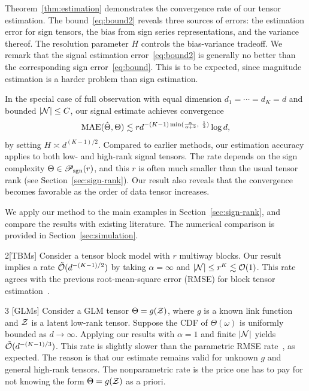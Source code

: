 \documentclass{article}
\theoremstyle{plain}
\theoremstyle{definition}
\def\caliP{\mathscr{P}_{\textup{sgn}}}
\begin{document}
Theorem~\ref{thm:estimation} demonstrates the convergence rate of our tensor estimation. The bound~\eqref{eq:bound2} reveals three sources of errors: the estimation error for sign tensors, the bias from sign series representations, and the variance thereof. The resolution parameter $H$ controls the bias-variance tradeoff. We remark that the signal estimation error~\eqref{eq:bound2} is generally no better than the corresponding sign error~\eqref{eq:bound}. This is to be expected, since magnitude estimation is  a harder problem than sign estimation. 

In the special case of full observation with equal dimension $d_1=\cdots=d_K=d$ and bounded $|\mathcal{N}|\leq C$, our signal estimate achieves convergence
\begin{equation}
\textup{MAE}(\hat \Theta, \Theta)\lesssim rd^{-(K-1)\min({\alpha\over \alpha+2},\ {1\over 2})}\log d,
\end{equation}
by setting $H\asymp d^{(K-1)/2}$. Compared to earlier methods, our estimation accuracy applies to both low- and high-rank signal tensors. The rate depends on the sign complexity $\Theta\in\caliP(r)$, and this $r$ is often much smaller than the usual tensor rank (see Section~\ref{sec:sign-rank}). Our result also reveals that the convergence becomes favorable as the order of data tensor increases. 

We apply our method to the main examples in Section~\ref{sec:sign-rank}, and compare the results with existing literature. The numerical comparison is provided in Section~\ref{sec:simulation}. 

\vspace{.05cm}
\begin{customexample}{2}[TBMs]
Consider a tensor block model with $r$ multiway blocks. Our result implies a rate $\tilde {\mathcal{O}}(d^{-(K-1)/2})$ by taking $\alpha=\infty$ and $|\mathcal{N}| \leq r^K\lesssim \mathcal{O}(1)$. This rate agrees with the  previous root-mean-square error (RMSE) for block tensor estimation~\citep{wang2019multiway}.
\end{customexample}
\vspace{.05cm}

\begin{customexample}{3} [GLMs] 
Consider a GLM tensor $\Theta=g(\mathcal{Z})$, where $g$ is a known link function and $\mathcal{Z}$ is a latent low-rank tensor. Suppose the CDF of $\Theta(\omega)$ is uniformly bounded as $d\to\infty$. Applying our results with $\alpha=1$ and finite $|\mathcal{N}|$ yields $\tilde {\mathcal{O}}(d^{-(K-1)/3})$. This rate is slightly slower than the parametric RMSE rate~\citep{zhang2018tensor,wang2018learning}, as expected. The reason is that our estimate remains valid for unknown $g$ and general high-rank tensors. The nonparametric rate is the price one has to pay for not knowing the form $\Theta=g(\mathcal{Z})$ as a priori. 
\end{customexample}
\vspace{.05cm}
\end{document}

